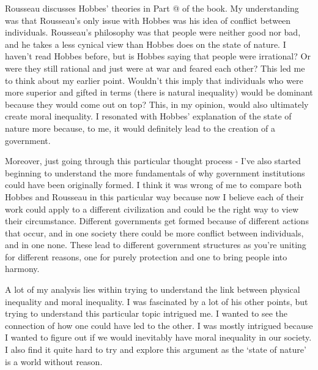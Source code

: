 \documentclass[11pt, oneside]{article}
\makeatletter
\newcommand*{\rom}[1]{\expandafter\@slowromancap\romannumeral #1@}
\makeatother
\begin{document}
\par Rousseau discusses Hobbes' theories in Part \rom{1} of the book. My understanding was that Rousseau's only issue with Hobbes was his idea of conflict between individuals. Rousseau's philosophy was that people were neither good nor bad, and he takes a less cynical view than Hobbes does on the state of nature. I haven't read Hobbes before, but is Hobbes saying that people were irrational? Or were they still rational and just were at war and feared each other? This led me to think about my earlier point. Wouldn't this imply that individuals who were more superior and gifted in terms (there is natural inequality) would be dominant because they would come out on top? This, in my opinion, would also ultimately create moral inequality. I resonated with Hobbes' explanation of the state of nature more because, to me, it would definitely lead to the creation of a government. 

\par Moreover, just going through this particular thought process - I've also started beginning to understand the more fundamentals of why government institutions could have been originally formed. I think it was wrong of me to compare both Hobbes and Rousseau in this particular way because now I believe each of their work could apply to a different civilization and could be the right way to view their circumstance. Different governments get formed because of different actions that occur, and in one society there could be more conflict between individuals, and in one none. These lead to different government structures as you're uniting for different reasons, one for purely protection and one to bring people into harmony. 

\par A lot of my analysis lies within trying to understand the link between physical inequality and moral inequality. I was fascinated by a lot of his other points, but trying to understand this particular topic intrigued me. I wanted to see the connection of how one could have led to the other. I was mostly intrigued because I wanted to figure out if we would inevitably have moral inequality in our society. I also find it quite hard to try and explore this argument as the `state of nature' is a world without reason.
\end{document}
